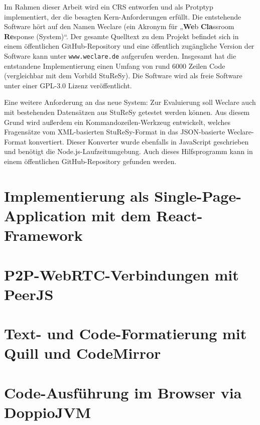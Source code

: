 Im Rahmen dieser Arbeit wird ein CRS entworfen und als Protptyp implementiert, der die besagten Kern-Anforderungen erfüllt. Die entstehende Software hört auf den Namen Weclare (ein Akronym für „\textbf{We}b \textbf{Cla}ssroom \textbf{Re}sponse (System)“. Der gesamte Quelltext zu dem Projekt befindet sich in einem öffentlichen GitHub-Repository\cite{web:github_weclare} und eine öffentlich zugängliche Version der Software kann unter \texttt{www.weclare.de} aufgerufen werden. Insgesamt hat die entstandene Implementierung einen Umfang von rund 6000 Zeilen Code (vergleichbar mit dem Vorbild StuReSy). Die Software wird als freie Software unter einer GPL-3.0 Lizenz veröffentlicht.

Eine weitere Anforderung an das neue System: Zur Evaluierung soll Weclare auch mit bestehenden Datensätzen aus StuReSy getestet werden können. Aus diesem Grund wird außerdem ein Kommandozeilen-Werkzeug entwickelt, welches Fragensätze vom XML-basierten StuReSy-Format in das JSON-basierte Weclare-Format konvertiert. Dieser Konverter wurde ebenfalls in JavaScript geschrieben und benötigt die Node.js-Laufzeitumgebung. Auch dieses Hilfsprogramm kann in einem öffentlichen GitHub-Repository\cite{web:github_converter} gefunden werden. 


\newpage
\section{Implementierung als Single-Page-Application mit dem React-Framework}
\label{chap:react_einfuehrung}


\newpage
\section{P2P-WebRTC-Verbindungen mit PeerJS}
\label{chap:p2p}


\newpage
\section{Text- und Code-Formatierung mit Quill und CodeMirror}
\label{chap:formatierung}


\newpage
\section{Code-Ausführung im Browser via DoppioJVM}
\label{chap:ausfuehrung}
